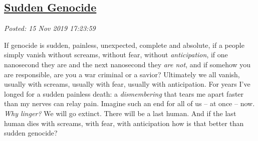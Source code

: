 %

\subsection*{\href{https://analyzethedatanotthedrivel.org/2019/11/15/sudden-genocide/}{Sudden Genocide}}


\noindent\emph{Posted: 15 Nov 2019 17:23:59}
\vspace{6pt}

If genocide is sudden, painless, unexpected, complete and absolute, if a
people simply vanish without screams, without fear, without
\emph{anticipation}, if one nanosecond they are and the next nanosecond
they \emph{are not}, and if somehow you are responsible, are you a war
criminal or a savior? Ultimately we all vanish, usually with screams,
usually with fear, usually with anticipation. For years I've longed for
a sudden painless death: a \emph{dismembering} that tears me apart
faster than my nerves can relay pain. Imagine such an end for all of us
-- at once -- now. \emph{Why linger?} We will go extinct. There will be
a last human. And if the last human dies with screams, with fear, with
anticipation how is that better than sudden genocide?



%
 

